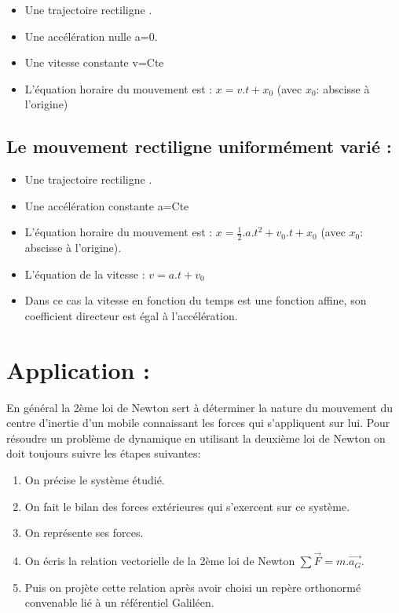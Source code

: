 \documentclass[12pt]{article}
\begin{document}
\begin{itemize}
	\item Une trajectoire rectiligne .
	\item Une accélération nulle a=0.
	\item Une vitesse constante v=Cte
	\item L'équation horaire du mouvement est : $x = v.t+x_0$ (avec $x_0$: abscisse à l'origine)

\end{itemize}

\subsection{Le mouvement rectiligne uniformément varié : }

\begin{itemize}
	\item Une trajectoire rectiligne .
	\item  Une accélération constante a=Cte
	\item L'équation horaire du mouvement est : $x = \frac{1}{2}.a.t^2 + v_0.t+ x_0$ (avec $ x_0$: abscisse à l'origine).
	\item L'équation de la vitesse : $v = a.t + v_0$
	\item Dans ce cas la vitesse en fonction du temps est une fonction affine, son coefficient directeur est égal à l'accélération.
\end{itemize}


\section{Application :}
En général la 2ème loi de Newton sert à déterminer la nature du mouvement du centre d'inertie d'un mobile connaissant les
forces qui s'appliquent sur lui.
Pour résoudre un problème de dynamique en utilisant la deuxième loi de Newton on doit toujours suivre les étapes suivantes:
\begin{enumerate}
	\item  On précise le système étudié.
	\item  On fait le bilan des forces extérieures qui s'exercent sur ce système.
\item  On représente ses forces.
\item  On écris la relation vectorielle de la 2ème loi de Newton $\sum \vec{F} = m.\vec{a_G}$.

\item  Puis on projète cette relation après avoir choisi un repère orthonormé convenable lié à un référentiel Galiléen.



\end{enumerate}
\end{document}

